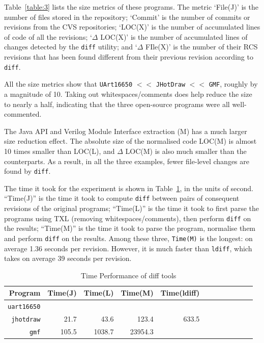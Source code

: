 \documentclass[10pt, conference, compsocconf]{IEEEtran}
\begin{document}
{Table~\ref{table:3} lists the size metrics of these programs. The metric `File(J)'  is the number of files stored in the repository; `Commit' is the number of commits or revisions from the CVS repositories; `LOC(X)' is the number of accumulated lines of code of all the revisions; `$\Delta$ LOC(X)' is the number of accumulated lines of changes detected by the {\tt diff} utility; and `$\Delta$ FIle(X)' is the number of their RCS revisions that has been found different from their previous revision according to {\tt diff}.

All the size metrics show that  {\tt UArt16650} $<<$ {\tt JHotDraw} $<<$ {\tt GMF}, roughly by a magnitude of 10. 
Taking out whitespaces/comments does help reduce the size to nearly a half, 
indicating that the three open-source programs were all well-commented. 

The Java API and Verilog Module Interface extraction (M) has a much larger size reduction effect. The absolute size of the normalised code LOC(M) is almost 10 times smaller than LOC(L), and $\Delta$ LOC(M) is also much smaller than the counterparts. As a result, in all the three examples, fewer file-level changes are found by {\tt diff}.

The time it took for the experiment is shown in Table~\ref{table:time}, in the units of second. ``Time(J)'' is the time it took to compute {\tt diff} between pairs of consequent revisions of the original programs; ``Time(L)'' is  the time it took to first parse the programs using TXL (removing whitespaces/comments), then perform {\tt diff} on the results; ``Time(M)'' is the time it took to parse the program, normalise them and perform {\tt diff} on the results. Among these three, {\tt Time(M)} is the longest: on 
average 1.36 seconds per revision. However, it is much faster than {\tt ldiff}, which takes on average 39 seconds per revision. 
\begin{table}\centering
\caption{Time Performance of diff tools\label{table:time}}
\begin{tabular}{| r || r | r | r || r | r || r| r|  r || r | r | r |}\hline
Program & \footnotesize  Time(J) & \footnotesize Time(L) & \footnotesize Time(M) & Time(ldiff) \\  \hline\hline
{\tt uart16650} &  &\\\hline
{\tt jhotdraw} & 21.7 & 43.6 & 123.4 & 633.5 \\\hline
{\tt gmf} & 105.5  & 1038.7 & 23954.3 \\\hline
\hline\end{tabular}
\end{table}



}
\end{document}
